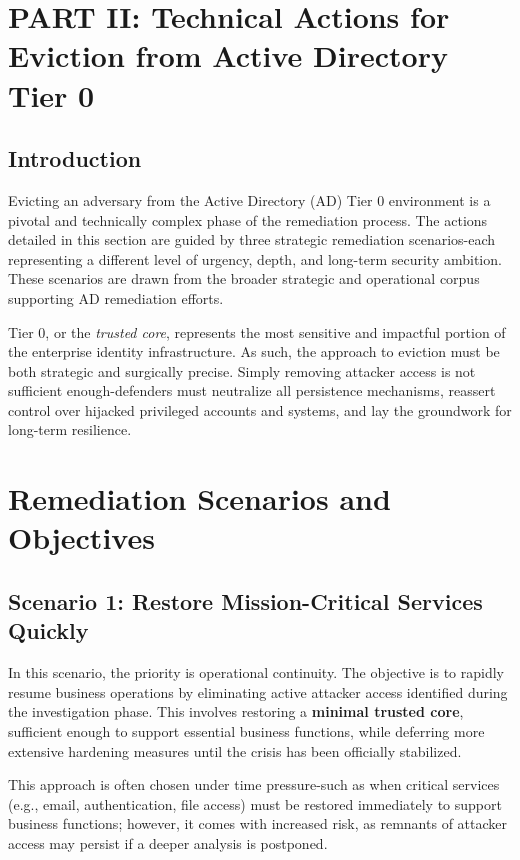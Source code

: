 \section{PART II: Technical Actions for Eviction from Active Directory Tier 0}

\subsection{Introduction}
Evicting an adversary from the Active Directory (AD) Tier 0 environment is a pivotal and technically complex phase of the remediation process. The actions detailed in this section are guided by three strategic remediation scenarios-each representing a different level of urgency, depth, and long-term security ambition. These scenarios are drawn from the broader strategic and operational corpus supporting AD remediation efforts.

Tier 0, or the \textit{trusted core}, represents the most sensitive and impactful portion of the enterprise identity infrastructure. As such, the approach to eviction must be both strategic and surgically precise. Simply removing attacker access is not sufficient enough-defenders must neutralize all persistence mechanisms, reassert control over hijacked privileged accounts and systems, and lay the groundwork for long-term resilience.

\section{Remediation Scenarios and Objectives}

\subsection{Scenario 1: Restore Mission-Critical Services Quickly}
In this scenario, the priority is operational continuity. The objective is to rapidly resume business operations by eliminating active attacker access identified during the investigation phase. This involves restoring a \textbf{minimal trusted core}, sufficient enough to support essential business functions, while deferring more extensive hardening measures until the crisis has been officially stabilized.

This approach is often chosen under time pressure-such as when critical services (e.g., email, authentication, file access) must be restored immediately to support business functions; however, it comes with increased risk, as remnants of attacker access may persist if a deeper analysis is postponed.

